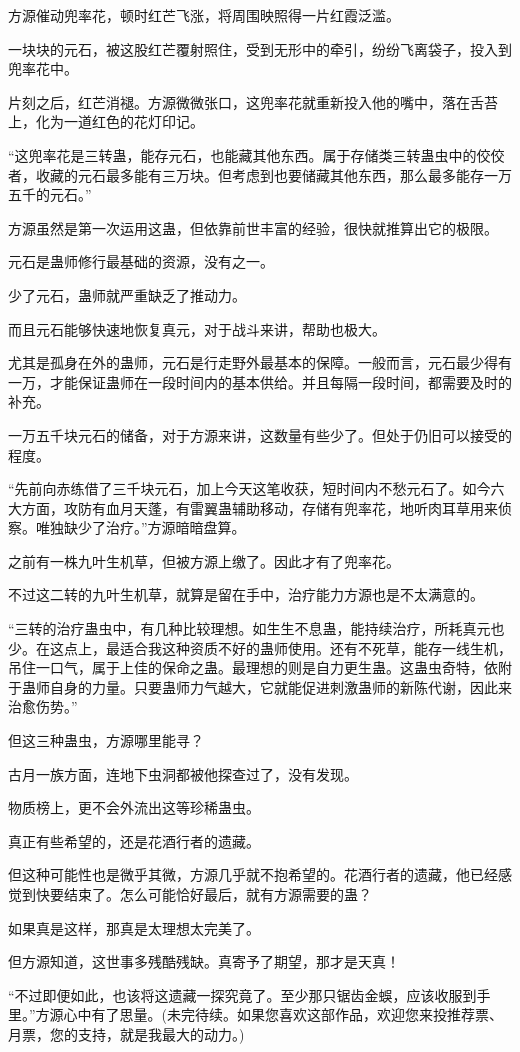 \begin{this_body}
方源催动兜率花，顿时红芒飞涨，将周围映照得一片红霞泛滥。

一块块的元石，被这股红芒覆射照住，受到无形中的牵引，纷纷飞离袋子，投入到兜率花中。

片刻之后，红芒消褪。方源微微张口，这兜率花就重新投入他的嘴中，落在舌苔上，化为一道红色的花灯印记。

“这兜率花是三转蛊，能存元石，也能藏其他东西。属于存储类三转蛊虫中的佼佼者，收藏的元石最多能有三万块。但考虑到也要储藏其他东西，那么最多能存一万五千的元石。”

方源虽然是第一次运用这蛊，但依靠前世丰富的经验，很快就推算出它的极限。

元石是蛊师修行最基础的资源，没有之一。

少了元石，蛊师就严重缺乏了推动力。

而且元石能够快速地恢复真元，对于战斗来讲，帮助也极大。

尤其是孤身在外的蛊师，元石是行走野外最基本的保障。一般而言，元石最少得有一万，才能保证蛊师在一段时间内的基本供给。并且每隔一段时间，都需要及时的补充。

一万五千块元石的储备，对于方源来讲，这数量有些少了。但处于仍旧可以接受的程度。

“先前向赤练借了三千块元石，加上今天这笔收获，短时间内不愁元石了。如今六大方面，攻防有血月天蓬，有雷翼蛊辅助移动，存储有兜率花，地听肉耳草用来侦察。唯独缺少了治疗。”方源暗暗盘算。

之前有一株九叶生机草，但被方源上缴了。因此才有了兜率花。

不过这二转的九叶生机草，就算是留在手中，治疗能力方源也是不太满意的。

“三转的治疗蛊虫中，有几种比较理想。如生生不息蛊，能持续治疗，所耗真元也少。在这点上，最适合我这种资质不好的蛊师使用。还有不死草，能存一线生机，吊住一口气，属于上佳的保命之蛊。最理想的则是自力更生蛊。这蛊虫奇特，依附于蛊师自身的力量。只要蛊师力气越大，它就能促进刺激蛊师的新陈代谢，因此来治愈伤势。”

但这三种蛊虫，方源哪里能寻？

古月一族方面，连地下虫洞都被他探查过了，没有发现。

物质榜上，更不会外流出这等珍稀蛊虫。

真正有些希望的，还是花酒行者的遗藏。

但这种可能性也是微乎其微，方源几乎就不抱希望的。花酒行者的遗藏，他已经感觉到快要结束了。怎么可能恰好最后，就有方源需要的蛊？

如果真是这样，那真是太理想太完美了。

但方源知道，这世事多残酷残缺。真寄予了期望，那才是天真！

“不过即便如此，也该将这遗藏一探究竟了。至少那只锯齿金蜈，应该收服到手里。”方源心中有了思量。(未完待续。如果您喜欢这部作品，欢迎您来投推荐票、月票，您的支持，就是我最大的动力。)

\end{this_body}

